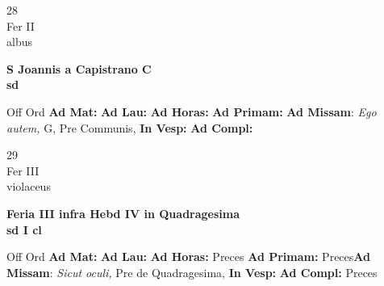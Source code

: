 \documentclass[10pt, openany]{book}
\begin{document}
    \begin{center}
        \begin{minipage}{3.5in}
            \vspace{2em}
            \begin{minipage}{0.5in}
                {\Huge 28} \\
                {\normalsize Fer II} \\
                {\normalsize albus}
            \end{minipage}
            \begin{minipage}{3.0in}
                \textbf{ \large S Joannis a Capistrano C \\
                \textnormal{\normalsize sd}} \\ 
            \end{minipage}
            \begin{justify}Off Ord
                \textbf{Ad Mat: }
                \textbf{Ad Lau: }
                \textbf{Ad Horas: }
                \textbf{Ad Primam: }\textbf{Ad Missam}: \textit{Ego autem,} G, Pre Communis,  
                \textbf{In Vesp: }
                \textbf{Ad Compl: }
            \end{justify}
        \end{minipage}
    \end{center}

    \begin{center}
        \begin{minipage}{3.5in}
            \vspace{2em}
            \begin{minipage}{0.5in}
                {\Huge 29} \\
                {\normalsize Fer III} \\
                {\normalsize violaceus}
            \end{minipage}
            \begin{minipage}{3.0in}
                \textbf{ \large Feria III infra Hebd IV in Quadragesima  \\
                \textnormal{\normalsize sd I cl}} \\ 
            \end{minipage}
            \begin{justify}Off Ord
                \textbf{Ad Mat: }
                \textbf{Ad Lau: }
                \textbf{Ad Horas: }Preces
                \textbf{Ad Primam: }Preces\textbf{Ad Missam}: \textit{Sicut oculi,} Pre de Quadragesima,  
                \textbf{In Vesp: }
                \textbf{Ad Compl: }Preces
            \end{justify}
        \end{minipage}
    \end{center}
\end{document}
